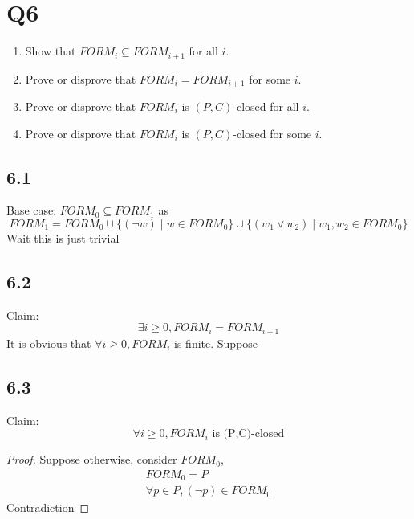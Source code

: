 \documentclass{article}
\begin{document}
\section*{Q6}
\begin{enumerate}
  \item Show that ${FORM}_i \subseteq {FORM}_{i+1}$ for all $i$.
  \item Prove or disprove that ${FORM}_i = {FORM}_{i+1}$ for some $i$.
  \item Prove or disprove that ${FORM}_i$ is $(P,C)$-closed for all $i$.
  \item Prove or disprove that ${FORM}_i$ is $(P,C)$-closed for some $i$.
\end{enumerate}
\subsection*{6.1}
Base case: $FORM_0 \subseteq FORM_1$
    as \[FORM_1 = FORM_0 \cup \{(\neg w)\mid w \in FORM_0\} \cup \{(w_1 \lor w_2) \mid w_1, w_2 \in FORM_0\}\]
    Wait this is just trivial
\subsection*{6.2}
Claim: \[\exists i \geq 0, FORM_i = FORM_{i+1}\]
It is obvious that $\forall i \geq 0, FORM_i$ is finite. Suppose 

\subsection*{6.3}
Claim:\[\forall i \geq 0, FORM_i \text{ is (P,C)-closed}\]
\begin{proof}
    Suppose otherwise, consider $FORM_0$, 
    \begin{align*}
        FORM_0 = P\\
        \forall p \in P, (\neg p) \in FORM_0
    \end{align*}
    Contradiction
\end{proof}
\end{document}
